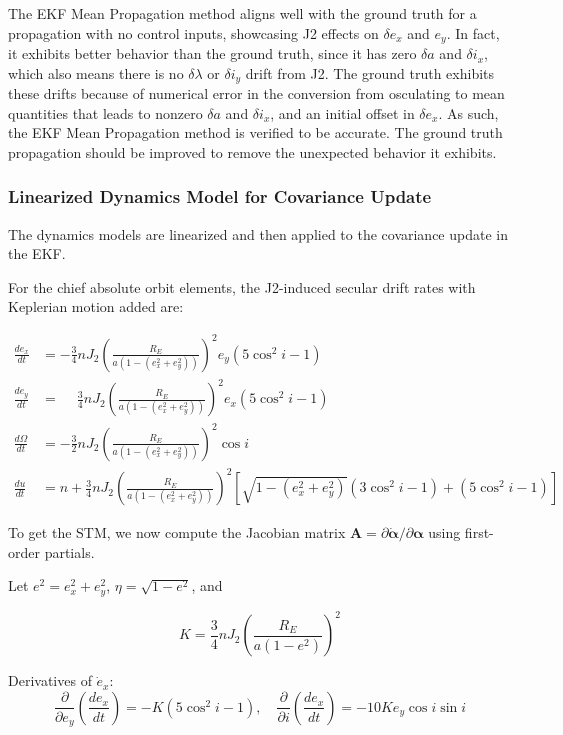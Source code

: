 The EKF Mean Propagation method aligns well with the ground truth for a propagation with no control inputs, showcasing J2 effects on $\delta e_x$ and $e_y$. In fact, it exhibits better behavior than the ground truth, since it has zero $\delta a$ and $\delta i_x$, which also means there is no $\delta \lambda$ or $\delta i_y$ drift from J2. The ground truth exhibits these drifts because of numerical error in the conversion from osculating to mean quantities that leads to nonzero $\delta a$ and $\delta i_x$, and an initial offset in $\delta e_x$. As such, the EKF Mean Propagation method is verified to be accurate. The ground truth propagation should be improved to remove the unexpected behavior it exhibits. 

\subsubsection{Linearized Dynamics Model for Covariance Update}
The dynamics models are linearized and then applied to the covariance update in the EKF.  

For the chief absolute orbit elements, the J2-induced secular drift rates with Keplerian motion added are:

\begin{align}
\frac{d e_x}{d t} &= -\frac{3}{4} n J_2 \left( \frac{R_E}{a \left( 1 - (e_x^2 + e_y^2) \right)} \right)^2 e_y (5 \cos^2 i - 1) \\
\frac{d e_y}{d t} &= \phantom{-}\frac{3}{4} n J_2 \left( \frac{R_E}{a \left( 1 - (e_x^2 + e_y^2) \right)} \right)^2 e_x (5 \cos^2 i - 1) \\
\frac{d \Omega}{d t} &= -\frac{3}{2} n J_2 \left( \frac{R_E}{a \left( 1 - (e_x^2 + e_y^2) \right)} \right)^2 \cos i  \\
\frac{d u}{d t} &= n + \frac{3}{4} n J_2 \left( \frac{R_E}{a \left( 1 - (e_x^2 + e_y^2) \right)} \right)^2 \left[ \sqrt{1 - (e_x^2 + e_y^2)} (3 \cos^2 i - 1) + (5 \cos^2 i - 1) \right] 
\end{align}

To get the STM, we now compute the Jacobian matrix \( \mathbf{A} = \partial \dot{\boldsymbol{\alpha}} / \partial \boldsymbol{\alpha} \) using first-order partials.

Let \( e^2 = e_x^2 + e_y^2 \), \( \eta = \sqrt{1 - e^2} \), and

\[
K = \frac{3}{4} n J_2 \left( \frac{R_E}{a(1 - e^2)} \right)^2
\]

Derivatives of \( \dot{e}_x \):
\[
\frac{\partial}{\partial e_y} \left( \frac{d e_x}{dt} \right) = -K (5 \cos^2 i - 1), \quad
\frac{\partial}{\partial i} \left( \frac{d e_x}{dt} \right) = -10 K e_y \cos i \sin i
\]

